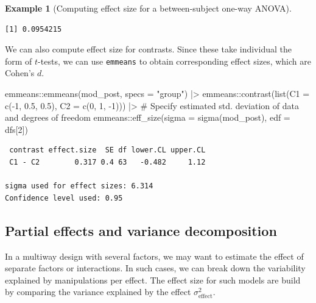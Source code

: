 \documentclass[
  11pt,
  letterpaper,
]{scrbook}
\newenvironment{Shaded}{\begin{snugshade}}{\end{snugshade}}
\newcommand{\AttributeTok}[1]{\textcolor[rgb]{0.40,0.45,0.13}{#1}}
\newcommand{\CommentTok}[1]{\textcolor[rgb]{0.37,0.37,0.37}{#1}}
\newcommand{\DecValTok}[1]{\textcolor[rgb]{0.68,0.00,0.00}{#1}}
\newcommand{\FloatTok}[1]{\textcolor[rgb]{0.68,0.00,0.00}{#1}}
\newcommand{\FunctionTok}[1]{\textcolor[rgb]{0.28,0.35,0.67}{#1}}
\newcommand{\NormalTok}[1]{\textcolor[rgb]{0.00,0.23,0.31}{#1}}
\newcommand{\SpecialCharTok}[1]{\textcolor[rgb]{0.37,0.37,0.37}{#1}}
\newcommand{\StringTok}[1]{\textcolor[rgb]{0.13,0.47,0.30}{#1}}
\theoremstyle{definition}
\theoremstyle{definition}
\newtheorem{example}{Example}[chapter]
\theoremstyle{remark}
\begin{document}
\begin{example}[Computing effect size for a between-subject one-way
ANOVA]
\begin{verbatim}
[1] 0.0954215
\end{verbatim}

We can also compute effect size for contrasts. Since these take
individual the form of \(t\)-tests, we can use \texttt{emmeans} to
obtain corresponding effect sizes, which are Cohen's \(d\).

\begin{Shaded}
\begin{Highlighting}[]
\NormalTok{emmeans}\SpecialCharTok{::}\FunctionTok{emmeans}\NormalTok{(mod\_post, }\AttributeTok{specs =} \StringTok{"group"}\NormalTok{) }\SpecialCharTok{|\textgreater{}} 
\NormalTok{  emmeans}\SpecialCharTok{::}\FunctionTok{contrast}\NormalTok{(}\FunctionTok{list}\NormalTok{(}\AttributeTok{C1 =} \FunctionTok{c}\NormalTok{(}\SpecialCharTok{{-}}\DecValTok{1}\NormalTok{, }\FloatTok{0.5}\NormalTok{, }\FloatTok{0.5}\NormalTok{), }
                         \AttributeTok{C2 =} \FunctionTok{c}\NormalTok{(}\DecValTok{0}\NormalTok{, }\DecValTok{1}\NormalTok{, }\SpecialCharTok{{-}}\DecValTok{1}\NormalTok{))) }\SpecialCharTok{|\textgreater{}}
\CommentTok{\# Specify estimated std. deviation of data and degrees of freedom }
\NormalTok{  emmeans}\SpecialCharTok{::}\FunctionTok{eff\_size}\NormalTok{(}\AttributeTok{sigma =} \FunctionTok{sigma}\NormalTok{(mod\_post), }\AttributeTok{edf =}\NormalTok{ dfs[}\DecValTok{2}\NormalTok{])}
\end{Highlighting}
\end{Shaded}

\begin{verbatim}
 contrast effect.size  SE df lower.CL upper.CL
 C1 - C2        0.317 0.4 63   -0.482     1.12

sigma used for effect sizes: 6.314 
Confidence level used: 0.95 
\end{verbatim}

\end{example}

\subsection{Partial effects and variance
decomposition}\label{partial-effects-and-variance-decomposition}

In a multiway design with several factors, we may want to estimate the
effect of separate factors or interactions. In such cases, we can break
down the variability explained by manipulations per effect. The effect
size for such models are build by comparing the variance explained by
the effect \(\sigma^2_{\text{effect}}\).
\end{document}
